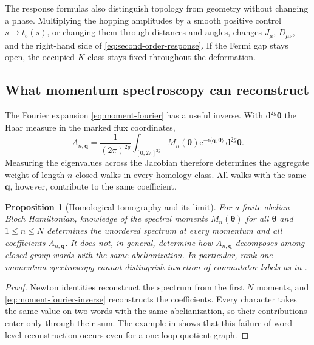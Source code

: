 \documentclass[11pt]{article}
\newtheorem{proposition}[theorem]{Proposition}
\theoremstyle{definition}
\theoremstyle{remark}
\newcommand{\dd}{\mathrm d}
\newcommand{\ii}{\mathrm i}
\newcommand{\e}{\mathrm e}
\begin{document}
The response formulas also distinguish topology from geometry without
changing a phase.  Multiplying the hopping amplitudes by a smooth positive
control \(s\mapsto t_e(s)\), or changing them through distances and angles,
changes \(J_\mu\), \(D_{\mu\nu}\), and the right-hand side of
\eqref{eq:second-order-response}.  If the Fermi gap stays open, the
occupied \(K\)-class stays fixed throughout the deformation.

\subsection{What momentum spectroscopy can reconstruct}

The Fourier expansion \eqref{eq:moment-fourier} has a useful inverse.  With
\(\dd^{2g}\bm\theta\) the Haar measure in the marked flux coordinates,
\[
 A_{n,\bm q}
   =\frac{1}{(2\pi)^{2g}}
     \int_{[0,2\pi]^{2g}}
       M_n(\bm\theta)
       \e^{-\ii\langle\bm q,\bm\theta\rangle}
       \,\dd^{2g}\bm\theta.
       \tag{4.28}\label{eq:moment-fourier-inverse}
\]
Measuring the eigenvalues across the Jacobian therefore determines the
aggregate weight of length-\(n\) closed walks in every homology class.  All
walks with the same \(\bm q\), however, contribute to the same coefficient.

\begin{proposition}[Homological tomography and its limit]
\label{prop:homological-tomography}
For a finite abelian Bloch Hamiltonian, knowledge of the spectral moments
\(M_n(\bm\theta)\) for all \(\bm\theta\) and
\(1\leq n\leq N\) determines the unordered spectrum at every momentum and all
coefficients \(A_{n,\bm q}\).  It does not, in general, determine how
\(A_{n,\bm q}\) decomposes among closed group words with the same
abelianization.  In particular, rank-one momentum spectroscopy cannot
distinguish insertion of commutator labels as in
.
\end{proposition}

\begin{proof}
Newton identities reconstruct the spectrum from the first \(N\) moments, and
\eqref{eq:moment-fourier-inverse} reconstructs the coefficients.  Every
character takes the same value on two words with the same abelianization, so
their contributions enter only through their sum.  The example in
 shows that this failure of word-level
reconstruction occurs even for a one-loop quotient graph.
\end{proof}
\end{document}
